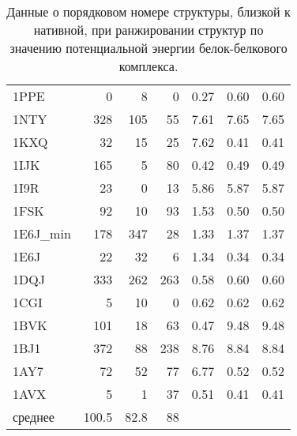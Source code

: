 \begin{table}[h]
\begin{center}
\begin{tabular}{ l | r | r | r | c | c | c }
       1PPE & 0 & 8 & 0 & 0.27 & 0.60 & 0.60 \\
       1NTY & 328 & 105 & 55 & 7.61 & 7.65 & 7.65 \\
       1KXQ & 32 & 15 & 25 & 7.62 & 0.41 & 0.41 \\
       1IJK & 165 & 5 & 80 & 0.42 & 0.49 & 0.49 \\
       1I9R & 23 & 0 & 13 & 5.86 & 5.87 & 5.87 \\
       1FSK & 92 & 10 & 93 & 1.53 & 0.50 & 0.50 \\
       1E6J\_min & 178 & 347 & 28 & 1.33 & 1.37 & 1.37 \\
       1E6J & 22 & 32 & 6 & 1.34 & 0.34 & 0.34 \\
       1DQJ & 333 & 262 & 263 & 0.58 & 0.60 & 0.60 \\
       1CGI & 5 & 10 & 0 & 0.62 & 0.62 & 0.62 \\
       1BVK & 101 & 18 & 63 & 0.47 & 9.48 & 9.48 \\
       1BJ1 & 372 & 88 & 238 & 8.76 & 8.84 & 8.84 \\
       1AY7 & 72 & 52 & 77 & 6.77 & 0.52 & 0.52 \\
       1AVX & 5 & 1 & 37 & 0.51 & 0.41 & 0.41 \\
       \hline
       среднее & 100.5 & 82.8 & 88 &
    \end{tabular}
    \end{center}
    \caption{Данные о порядковом номере структуры, близкой к нативной, при ранжировании структур по значению потенциальной энергии белок-белкового комплекса. }
    \label{table_res_1}
  \end{table}

